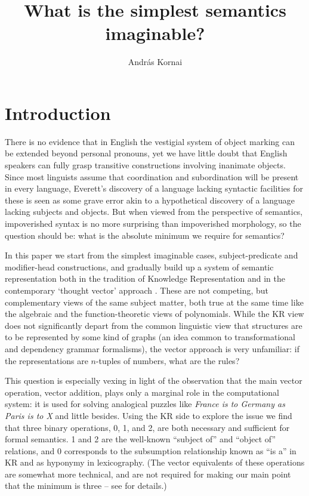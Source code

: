 \documentclass[output=paper,colorlinks=true,citecolor=brown]{langscibook}
\author{Andr\'as Kornai\orcid{0000-0001-6078-6840}\affiliation{Budapest University of Technology and Economics}}
\title{What is the simplest semantics imaginable?}
\begin{document}
\maketitle

\section{Introduction}

There is no evidence that in English the vestigial system of object marking can
be extended beyond personal pronouns, yet we have little doubt that English
speakers can fully grasp transitive constructions involving inanimate
objects. Since most linguists assume that coordination and subordination will
be present in every language, Everett's discovery of a language lacking
syntactic facilities for these is seen as some grave error akin to a
hypothetical discovery of a language lacking subjects and objects. But when
viewed from the perspective of semantics, impoverished syntax is no more
surprising than impoverished morphology, so the question should be: what is
the absolute minimum we require for semantics?

In this paper we start from the simplest imaginable cases, subject-predicate
and modifier-head constructions, and gradually build up a system of semantic
representation both in the tradition of Knowledge Representation
\citep{Brachman:2004} and in the contemporary `thought vector' approach
\citep{LeCun:2015,Kornai:2022}. These are not competing, but complementary
views of the same subject matter, both true at the same time like the
algebraic and the function-theoretic views of polynomials. While the KR view
does not significantly depart from the common linguistic view that
structures are to be represented by some kind of graphs (an idea common to
transformational and dependency grammar formalisms), the vector approach is
very unfamiliar: if the representations are $n$-tuples of numbers, what are
the rules?

This question is especially vexing in light of the observation that the main
vector operation, vector addition, plays only a marginal role in the
computational system: it is used for solving analogical puzzles like \emph{France is to Germany as Paris is to X} \citep{Mikolov:2013l} and little
besides. Using the KR side to explore the issue we find that three binary
operations, 0, 1, and 2, are both necessary and sufficient for formal
semantics. 1 and 2 are the well-known ``subject of'' and ``object of''
relations, and 0 corresponds to the subsumption relationship known as ``is a''
in KR and as hyponymy in lexicography. (The vector equivalents of these
operations are somewhat more technical, and are not required for making our
main point that the minimum is three -- see \citet{Kornai:2022} for details.)
\end{document}
